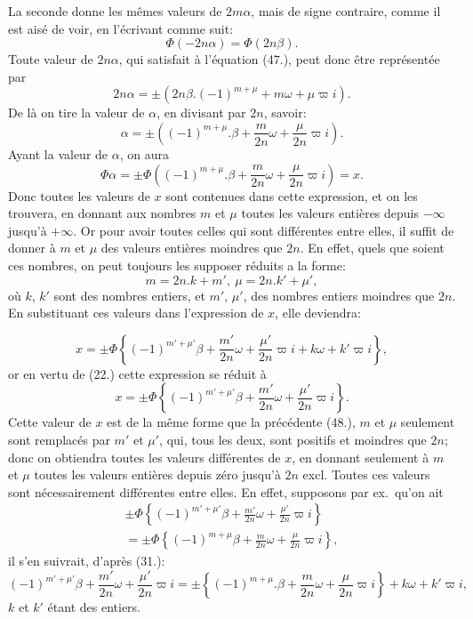 \documentclass{article}
\begin{document}
La seconde donne les mêmes valeurs de $2m\alpha$, mais de signe contraire, comme il est aisé de voir, en l'écrivant comme suit:
\[ \Phi(-2n\alpha)=\Phi(2n\beta). \]
Toute valeur de $2n\alpha$, qui satisfait à l'équation (47.), peut donc être représentée par
\[ 2n\alpha=\pm(2n\beta.(-1)^{m+\mu}+m\omega+\mu\varpi i). \]
De là on tire la valeur de $\alpha$, en divisant par $2n$, savoir:
\[ \alpha=\pm\left((-1)^{m+\mu}.\beta+\frac{m}{2n}\omega+\frac{\mu}{2n}\varpi i\right). \]
Ayant la valeur de $\alpha$, on aura
\[ \Phi\alpha=\pm\Phi\left((-1)^{m+\mu}.\beta+\frac{m}{2n}\omega+\frac{\mu}{2n}\varpi i\right)=x. \tag{48.} \]
Donc toutes les valeurs de $x$ sont contenues dans cette expression, et on les trouvera, en donnant aux nombres $m$ et $\mu$ toutes les valeurs entières depuis $-\infty$ jusqu'à $+\infty$. Or pour avoir toutes celles qui sont différentes entre elles, il suffit de donner à $m$ et $\mu$ des valeurs entières moindres que $2n$. En effet, quels que soient ces nombres, on peut toujours les supposer réduits a la forme:
\[ m=2n.k+m',\ \mu=2n.k'+\mu', \]
où $k$, $k'$ sont des nombres entiers, et $m'$, $\mu'$, des nombres entiers moindres que $2n$. En substituant ces valeurs dans l'expression de $x$, elle deviendra:

\[ x=\pm\Phi\left\{(-1)^{m'+\mu'}\beta+\frac{m'}{2n}\omega+\frac{\mu'}{2n}\varpi i+k\omega+k'\varpi i\right\}, \]
or en vertu de (22.) cette expression se réduit à
\[ x=\pm\Phi\left\{(-1)^{m'+\mu'}\beta+\frac{m'}{2n}\omega+\frac{\mu'}{2n}\varpi i\right\}. \tag{49.} \]
Cette valeur de $x$ est de la même forme que la précédente (48.), $m$ et $\mu$ seulement sont remplacés par $m'$ et $\mu'$, qui, tous les deux, sont positifs et moindres que $2n$; donc on obtiendra toutes les valeurs différentes de $x$, en donnant seulement à $m$ et $\mu$ toutes les valeurs entières depuis zéro jusqu'à $2n$ excl. Toutes ces valeurs sont nécessairement différentes entre elles. En effet, supposons par ex.\ qu'on ait
\[ \begin{gathered} \pm\Phi\left\{(-1)^{m'+\mu'}\beta+\frac{m'}{2n}\omega+\frac{\mu'}{2n}\varpi i\right\}\\ =\pm\Phi\left\{(-1)^{m+\mu}\beta+\frac{m}{2n}\omega+\frac{\mu}{2n}\varpi i\right\}, \end{gathered} \]
il s'en suivrait, d'après (31.):
\[ (-1)^{m'+\mu'}\beta+\frac{m'}{2n}\omega+\frac{\mu'}{2n}\varpi i=\pm\left\{(-1)^{m+\mu}.\beta+\frac{m}{2n}\omega+\frac{\mu}{2n}\varpi i\right\}+k\omega+k'\varpi i, \]
$k$ et $k'$ étant des entiers.
\end{document}
